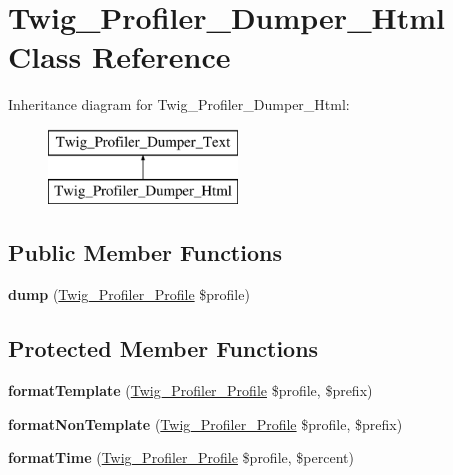\hypertarget{class_twig___profiler___dumper___html}{}\section{Twig\+\_\+\+Profiler\+\_\+\+Dumper\+\_\+\+Html Class Reference}
\label{class_twig___profiler___dumper___html}
Inheritance diagram for Twig\+\_\+\+Profiler\+\_\+\+Dumper\+\_\+\+Html\+:\begin{figure}[H]
\begin{center}
\leavevmode
\includegraphics[height=2.000000cm]{class_twig___profiler___dumper___html}
\end{center}
\end{figure}
\subsection*{Public Member Functions}
\begin{DoxyCompactItemize}
\item 
\hypertarget{class_twig___profiler___dumper___html_a6c5847be5fe44203b20ccca8ce59c05b}{}{\bfseries dump} (\hyperlink{class_twig___profiler___profile}{Twig\+\_\+\+Profiler\+\_\+\+Profile} \$profile)\label{class_twig___profiler___dumper___html_a6c5847be5fe44203b20ccca8ce59c05b}

\end{DoxyCompactItemize}
\subsection*{Protected Member Functions}
\begin{DoxyCompactItemize}
\item 
\hypertarget{class_twig___profiler___dumper___html_a02c170148566e209ced5cdf1b743418b}{}{\bfseries format\+Template} (\hyperlink{class_twig___profiler___profile}{Twig\+\_\+\+Profiler\+\_\+\+Profile} \$profile, \$prefix)\label{class_twig___profiler___dumper___html_a02c170148566e209ced5cdf1b743418b}

\item 
\hypertarget{class_twig___profiler___dumper___html_aa1161e3f32546d26391304d787264ddd}{}{\bfseries format\+Non\+Template} (\hyperlink{class_twig___profiler___profile}{Twig\+\_\+\+Profiler\+\_\+\+Profile} \$profile, \$prefix)\label{class_twig___profiler___dumper___html_aa1161e3f32546d26391304d787264ddd}

\item 
\hypertarget{class_twig___profiler___dumper___html_ae1ea1c70a40a31c730fd4cc049f31425}{}{\bfseries format\+Time} (\hyperlink{class_twig___profiler___profile}{Twig\+\_\+\+Profiler\+\_\+\+Profile} \$profile, \$percent)\label{class_twig___profiler___dumper___html_ae1ea1c70a40a31c730fd4cc049f31425}

\end{DoxyCompactItemize}


